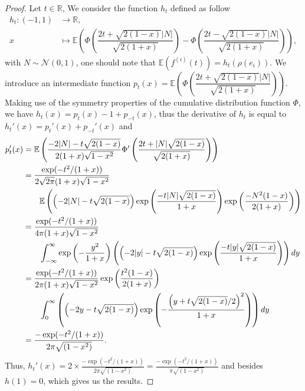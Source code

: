 \documentclass[12pt]{article}
\theoremstyle{Theorem}
\theoremstyle{definition}
\begin{document}
\begin{proof}
Let $t \in \mathbb{R}$, We consider the function $h_{t}$ defined as follow \begin{align*} 
h_{t}: (-1,1) &\longrightarrow \mathbb{R}, \\
x & \longmapsto \mathbb{E}\left(\Phi\left(\dfrac{2t + \sqrt{2(1-x)}|N|}{\sqrt{2(1+x)}}\right) - \Phi\left(\dfrac{2t - \sqrt{2(1-x)}|N|}{\sqrt{2(1+x)}}\right)\right),
\end{align*}
with $N \sim \mathcal{N}\left(0,1\right)$, one should note that $\mathbb{E}\left(f^{(i)}(t)\right) = h_{t}\left(\rho(e_i)\right)$. We introduce an intermediate function $p_{t}(x) = \mathbb{E}\left(\Phi\left(\dfrac{2t + \sqrt{2(1-x)}|N|}{\sqrt{2(1+x)}}\right)\right)$. Making use of the symmetry properties of the cumulative distribution function $\Phi$, \linebreak we have $h_{t}(x) =p_{t}(x) - 1 + p_{-t}(x)$, thus the derivative of $h_{t}$ is equal to $h_{t}'(x) = p_{t}'(x) + p_{-t}'(x)$ and 
\begin{align*}p_{t}'(x) & = \mathbb{E}\left(\frac{-2|N| -t\sqrt{2(1-x)}}{2(1+x)\sqrt{1-x^2}}\Phi'\left(\frac{2t + |N|\sqrt{2(1-x)}}{\sqrt{2(1+x)}}\right)\right)\\
& = \frac{\exp(-t^2/(1+x))}{2\sqrt{2\pi}(1+x)\sqrt{1-x^2}}\\
& \hspace{0.7cm}\mathbb{E}\left(\left(-2|N| -t\sqrt{2(1-x)}\right)\exp\left(\frac{-t|N|\sqrt{2(1-x)}}{1+x}\right)\exp\left(\frac{-N^{2}(1-x)}{2(1+x)}\right)\right) \\
& = \frac{\exp(-t^2/(1+x))}{4\pi(1+x)\sqrt{1-x^2}} \\
& \hspace{0.7cm} \int_{-\infty}^{\infty}\exp\left(-\frac{y^2}{1+x}\right)\left(\left(-2|y| -t\sqrt{2(1-x)}\right)\exp\left(\frac{-t|y|\sqrt{2(1-x)}}{1+x}\right)\right)dy\\
& = \frac{\exp(-t^2/(1+x))}{2\pi(1+x)\sqrt{1-x^2}}\exp\left(\frac{t^2(1-x)}{2(1+x)}\right) \\
& \hspace{0.7cm} \int_{0}^{\infty}\left(\left(-2y -t\sqrt{2(1-x)}\right)\exp\left(-\frac{\left(y+t\sqrt{2(1-x)}/2\right)^{2}}{1+x}\right)\right)dy \\
& = \frac{-\exp(-t^2/(1+x))}{2\pi\sqrt{(1-x^2)}}.
\end{align*}Thus, $h_{t}'(x) = 2 \times \frac{-\exp(-t^2/(1+x))}{2\pi\sqrt{(1-x^2)}} = \frac{-\exp(-t^2/(1+x))}{\pi\sqrt{(1-x^2)}}$ and besides $h(1) = 0$, which gives us the results.

\end{proof}
\end{document}
